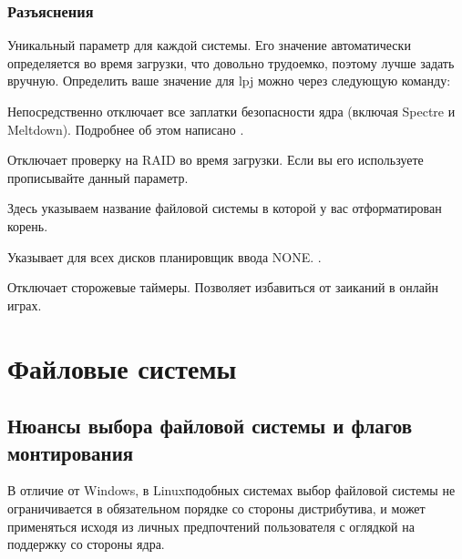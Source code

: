 \documentclass[letterpaper,10pt,russian,openany]{sphinxmanual}
\begin{document}
\subsection{Разъяснения}
\label{\detokenize{source/kernel-parameters:explanations}}\label{\detokenize{source/kernel-parameters:index-1}}\label{\detokenize{source/kernel-parameters:id3}}
\sphinxAtStartPar
{} \sphinxhyphen{} Уникальный параметр для каждой системы. Его значение автоматически определяется во время загрузки, что довольно трудоемко, поэтому лучше задать вручную.
Определить ваше значение для lpj можно через следующую команду: 

\sphinxAtStartPar
{} \sphinxhyphen{} Непосредственно отключает все заплатки безопасности ядра (включая Spectre и Meltdown).
Подробнее об этом написано .

\sphinxAtStartPar
{} \sphinxhyphen{} Отключает проверку на RAID во время загрузки. Если вы его используете \sphinxhyphen{}  прописывайте данный параметр.

\sphinxAtStartPar
{} \sphinxhyphen{} Здесь указываем название файловой системы в которой у вас отформатирован корень.

\sphinxAtStartPar
{} \sphinxhyphen{} Указывает для всех дисков планировщик ввода NONE. .

\sphinxAtStartPar
{} \sphinxhyphen{} Отключает сторожевые таймеры. Позволяет избавиться от заиканий в онлайн играх.

\sphinxstepscope


\chapter{Файловые системы}
\label{\detokenize{source/file-systems:file-systems}}\label{\detokenize{source/file-systems:id1}}\label{\detokenize{source/file-systems::doc}}
\ignorespaces 

\section{Нюансы выбора файловой системы и флагов монтирования}
\label{\detokenize{source/file-systems:file-system-selection}}\label{\detokenize{source/file-systems:index-0}}\label{\detokenize{source/file-systems:id2}}
\sphinxAtStartPar
В отличие от Windows, в Linux\sphinxhyphen{}подобных системах выбор файловой системы не ограничивается в обязательном порядке со стороны дистрибутива,
и может применяться исходя из личных предпочтений пользователя с оглядкой на поддержку со стороны ядра.
\end{document}
